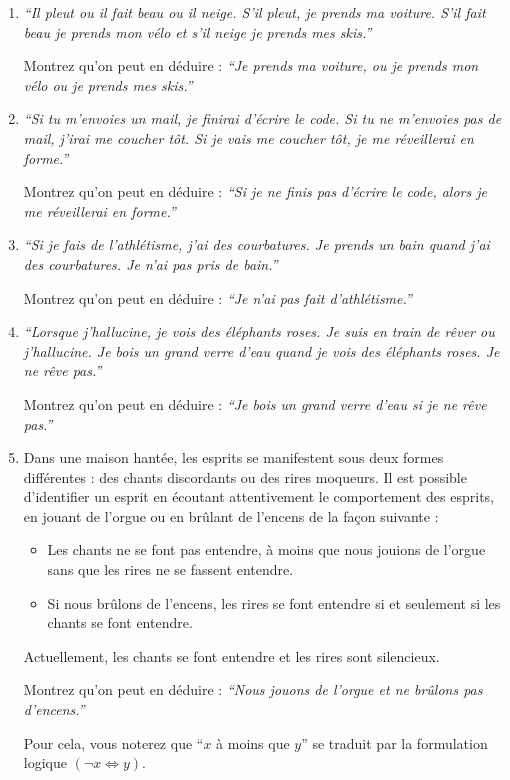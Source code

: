 \documentclass[a4paper,11pt]{article}
\begin{document}
\begin{enumerate}
\item \emph{``Il pleut ou il fait beau ou il neige. S'il pleut, je prends ma voiture. S'il fait beau je prends mon vélo et s'il neige je prends mes skis.''}

Montrez qu'on peut en déduire : \emph{``Je prends ma voiture, ou je prends mon vélo ou je prends mes skis.''}

\item \emph{``Si tu m'envoies un mail, je finirai d'écrire le code. Si tu ne m'envoies pas de mail, j'irai me coucher tôt. Si je vais me coucher tôt, je me réveillerai en forme.''}

Montrez qu'on peut en déduire : \emph{``Si je ne finis pas d'écrire le code, alors je me réveillerai en forme.''}

\item \emph{``Si je fais de l'athlétisme, j'ai des courbatures. Je prends un bain quand j'ai des courbatures. Je n'ai pas pris de bain.''}

Montrez qu'on peut en déduire : \emph{``Je n'ai pas fait d'athlétisme.''}

\item \emph{``Lorsque j'hallucine, je vois des éléphants roses. Je suis en train de rêver ou j'hallucine. Je bois un grand verre d'eau quand je vois des éléphants roses. Je ne rêve pas.''}

Montrez qu'on peut en déduire : \emph{``Je bois un grand verre d'eau si je ne rêve pas.''}

\item Dans une maison hantée, les esprits se manifestent sous deux formes différentes : des chants discordants ou des rires moqueurs. Il est possible d'identifier un esprit en écoutant attentivement le comportement des esprits, en jouant de l'orgue ou en brûlant de l'encens de la façon suivante :
\begin{itemize}
\item Les chants ne se font pas entendre, à moins que nous jouions de l'orgue sans que les rires ne se fassent entendre.
\item Si nous brûlons de l'encens, les rires se font entendre si et seulement si les chants se font entendre.
\end{itemize}

Actuellement, les chants se font entendre et les rires sont silencieux.

Montrez qu'on peut en déduire : \emph{``Nous jouons de l'orgue et ne brûlons pas d'encens.''}

Pour cela, vous noterez que ``$x$ à moins que $y$'' se traduit par la formulation logique $(\neg x \Leftrightarrow y)$.
\end{enumerate}
\end{document}
